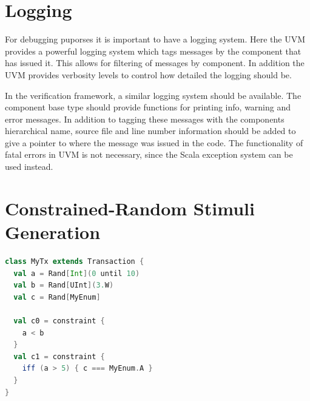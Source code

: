 \section{Logging} %
\label{sec:logging}

For debugging puporses it is important to have a logging system. Here the UVM provides a powerful logging system
which tags messages by the component that has issued it. This allows for filtering of messages by component. In
addition the UVM provides verbosity levels to control how detailed the logging should be.

In the verification framework, a similar logging system should be available. The component base type should provide
functions for printing info, warning and error messages. In addition to tagging these messages with the components
hierarchical name, source file and line number information should be added to give a pointer to where the message was
issued in the code. The functionality of fatal errors in UVM is not necessary, since the Scala exception system can
be used instead.

\section{Constrained-Random Stimuli Generation} %
\label{sec:crv}

\begin{listing}
\begin{lstlisting}[language=scala, captionpos=b, caption=Outline of the syntax for random variables and constraints.,label=lst:crv_syntax]
class MyTx extends Transaction {
  val a = Rand[Int](0 until 10)
  val b = Rand[UInt](3.W)
  val c = Rand[MyEnum]

  val c0 = constraint {
    a < b
  }
  val c1 = constraint {
    iff (a > 5) { c === MyEnum.A }
  }
}
\end{lstlisting}
\end{listing}


